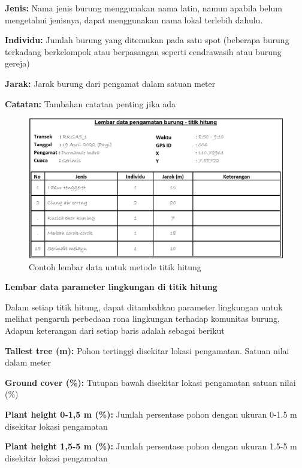 \documentclass[
]{book}
\begin{document}
\textbf{Jenis:} Nama jenis burung menggunakan nama latin, namun apabila belum mengetahui jenisnya, dapat menggunakan nama lokal terlebih dahulu.

\textbf{Individu:} Jumlah burung yang ditemukan pada satu spot (beberapa burung terkadang berkelompok atau berpasangan seperti cendrawasih atau burung gereja)

\textbf{Jarak:} Jarak burung dari pengamat dalam satuan meter

\textbf{Catatan:} Tambahan catatan penting jika ada

\begin{figure}

{\centering \includegraphics[width=1\linewidth]{images/ldp_th} 

}

\caption{Contoh lembar data untuk metode titik hitung}\label{fig:ldpth}
\end{figure}

\textbf{Lembar data parameter lingkungan di titik hitung}

Dalam setiap titik hitung, dapat ditambahkan parameter lingkungan untuk melihat pengaruh perbedaan rona lingkungan terhadap komunitas burung, Adapun keterangan dari setiap baris adalah sebagai berikut

\textbf{Tallest tree (m):} Pohon tertinggi disekitar lokasi pengamatan. Satuan nilai dalam meter

\textbf{Ground cover (\%):} Tutupan bawah disekitar lokasi pengamatan satuan nilai (\%)

\textbf{Plant height 0-1,5 m (\%):} Jumlah persentase pohon dengan ukuran 0-1.5 m disekitar lokasi pengamatan

\textbf{Plant height 1,5-5 m (\%):} Jumlah persentase pohon dengan ukuran 1.5-5 m disekitar lokasi pengamatan
\end{document}
